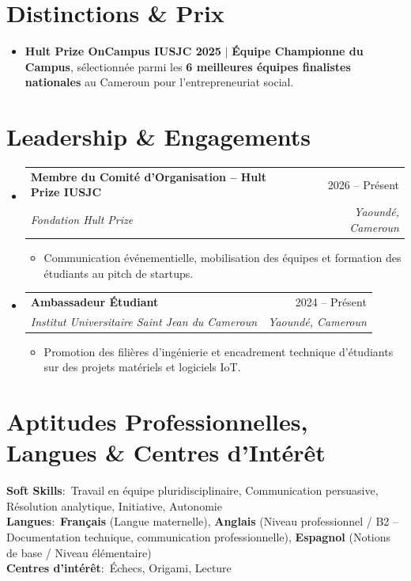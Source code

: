 \documentclass[letterpaper,10pt]{article}
\makeatletter
\newcommand{\resumeItem}[1]{
  \item\small{
    {#1 \vspace{-1.5pt}}
  }
}
\newcommand{\resumeSubheading}[4]{
  \vspace{-1pt}\item
    \begin{tabular*}{0.98\textwidth}[t]{l@{\extracolsep{\fill}}r}
      \textbf{#1} & #2 \\
      \textit{\small#3} & \textit{\small #4} \\
    \end{tabular*}\vspace{-5pt}
}
\newcommand{\resumeSubHeadingListStart}{\begin{itemize}[leftmargin=0.15in, label={}]}
\newcommand{\resumeSubHeadingListEnd}{\end{itemize}}
\newcommand{\resumeItemListStart}{\begin{itemize}[leftmargin=0.2in, label={$\vcenter{\hbox{\tiny$\bullet$}}$}, itemsep=1.2pt, parsep=0pt]}
\newcommand{\resumeItemListEnd}{\end{itemize}\vspace{-3pt}}
\makeatother
\begin{document}
\section{Distinctions \& Prix}
\begin{itemize}[leftmargin=0.15in, label={$\vcenter{\hbox{\tiny$\bullet$}}$}, itemsep=1pt]
    \resumeItem{\textbf{Hult Prize OnCampus IUSJC 2025} $|$ \textbf{Équipe Championne du Campus}, sélectionnée parmi les \textbf{6 meilleures équipes finalistes nationales} au Cameroun pour l'entrepreneuriat social.}
\end{itemize}

\section{Leadership \& Engagements}
  \resumeSubHeadingListStart
    \resumeSubheading
      {Membre du Comité d'Organisation -- Hult Prize IUSJC}{2026 -- Présent}
      {Fondation Hult Prize}{Yaoundé, Cameroun}
      \resumeItemListStart
        \resumeItem{Communication événementielle, mobilisation des équipes et formation des étudiants au pitch de startups.}
      \resumeItemListEnd
    \resumeSubheading
      {Ambassadeur Étudiant}{2024 -- Présent}
      {Institut Universitaire Saint Jean du Cameroun}{Yaoundé, Cameroun}
      \resumeItemListStart
        \resumeItem{Promotion des filières d'ingénierie et encadrement technique d'étudiants sur des projets matériels et logiciels IoT.}
      \resumeItemListEnd
  \resumeSubHeadingListEnd

\section{Aptitudes Professionnelles, Langues \& Centres d'Intérêt}
\begin{itemize}[leftmargin=0.15in, label={}]
    \small{\item{
     \textbf{Soft Skills}{:\ Travail en équipe pluridisciplinaire, Communication persuasive, Résolution analytique, Initiative, Autonomie} \\ \vspace{1.5pt}
     \textbf{Langues}{:\ \textbf{Français} (Langue maternelle), \textbf{Anglais} (Niveau professionnel / B2 -- Documentation technique, communication professionnelle), \textbf{Espagnol} (Notions de base / Niveau élémentaire)} \\ \vspace{1.5pt}
     \textbf{Centres d'intérêt}{:\ Échecs, Origami, Lecture}
    }}
\end{itemize}

\end{document}

